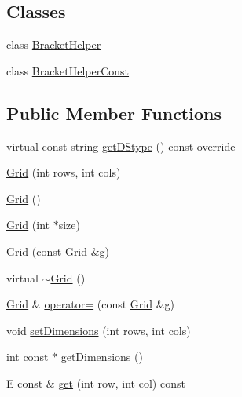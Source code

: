 \subsection*{Classes}
\begin{DoxyCompactItemize}
\item 
class \hyperlink{classbridges_1_1datastructure_1_1_grid_1_1_bracket_helper}{Bracket\+Helper}
\item 
class \hyperlink{classbridges_1_1datastructure_1_1_grid_1_1_bracket_helper_const}{Bracket\+Helper\+Const}
\end{DoxyCompactItemize}
\subsection*{Public Member Functions}
\begin{DoxyCompactItemize}
\item 
virtual const string \hyperlink{classbridges_1_1datastructure_1_1_grid_a16aeae38446b96f440dea15f2b19334d}{get\+D\+Stype} () const override
\item 
\hyperlink{classbridges_1_1datastructure_1_1_grid_a80d8bca9d3793d896a92168a54ce7b2b}{Grid} (int rows, int cols)
\item 
\hyperlink{classbridges_1_1datastructure_1_1_grid_a41c8c94cd9a22ccf978c5e2b1141c813}{Grid} ()
\item 
\hyperlink{classbridges_1_1datastructure_1_1_grid_ad47ddbed7bbd07f98aaa61b74fcf826c}{Grid} (int $\ast$size)
\item 
\hyperlink{classbridges_1_1datastructure_1_1_grid_afc81003993a30d1112d2dff71bfc191b}{Grid} (const \hyperlink{classbridges_1_1datastructure_1_1_grid}{Grid} \&g)
\item 
virtual \hyperlink{classbridges_1_1datastructure_1_1_grid_aa04b4929a35fa359dbaab86e46fda204}{$\sim$\+Grid} ()
\item 
\hyperlink{classbridges_1_1datastructure_1_1_grid}{Grid} \& \hyperlink{classbridges_1_1datastructure_1_1_grid_a3522d8c94ad390ebafb12257a6c9b82f}{operator=} (const \hyperlink{classbridges_1_1datastructure_1_1_grid}{Grid} \&g)
\item 
void \hyperlink{classbridges_1_1datastructure_1_1_grid_a234818a9e22b6cefe943210c088c2a76}{set\+Dimensions} (int rows, int cols)
\item 
int const  $\ast$ \hyperlink{classbridges_1_1datastructure_1_1_grid_a5f1427f96782b3667585c06caef0b533}{get\+Dimensions} ()
\item 
E const  \& \hyperlink{classbridges_1_1datastructure_1_1_grid_a1ff40a322e0c6407affb608366f895b6}{get} (int row, int col) const

\end{DoxyCompactItemize}

